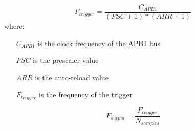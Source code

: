 \[
  F_{trigger} = \frac{C_{APB1}}{(PSC+1)*(ARR+1)}
\]
where:
\begin{itemize}
  \item[$C_{APB1}$] is the clock frequency of the APB1 bus
  \item[$PSC$] is the prescaler value
  \item[$ARR$] is the auto-reload value
  \item[$F_{trigger}$] is the frequency of the trigger
\end{itemize}

\[
  F_{output} = \frac{F_{trigger}}{N_{samples}}
\]